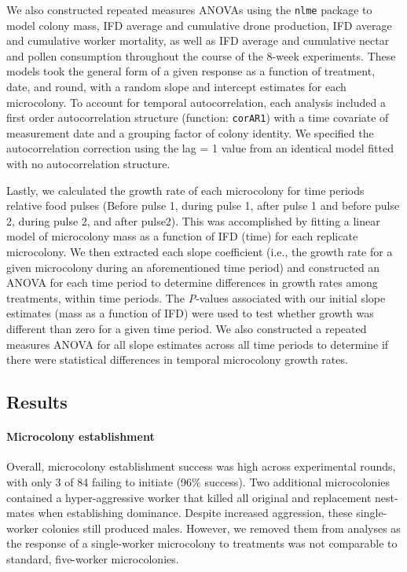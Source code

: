 \documentclass[11pt,]{article}
\let\oldparagraph\paragraph
\renewcommand{\paragraph}[1]{\oldparagraph{#1}\mbox{}}
\begin{document}
We also constructed repeated measures ANOVAs using the \texttt{nlme}
package to model colony mass, IFD average and cumulative drone
production, IFD average and cumulative worker mortality, as well as IFD
average and cumulative nectar and pollen consumption throughout the
course of the 8-week experiments. These models took the general form of
a given response as a function of treatment, date, and round, with a
random slope and intercept estimates for each microcolony. To account
for temporal autocorrelation, each analysis included a first order
autocorrelation structure (function: \texttt{corAR1}) with a time
covariate of measurement date and a grouping factor of colony identity.
We specified the autocorrelation correction using the lag = 1 value from
an identical model fitted with no autocorrelation structure.

Lastly, we calculated the growth rate of each microcolony for time
periods relative food pulses (Before pulse 1, during pulse 1, after
pulse 1 and before pulse 2, during pulse 2, and after pulse2). This was
accomplished by fitting a linear model of microcolony mass as a function
of IFD (time) for each replicate microcolony. We then extracted each
slope coefficient (i.e., the growth rate for a given microcolony during
an aforementioned time period) and constructed an ANOVA for each time
period to determine differences in growth rates among treatments, within
time periods. The \emph{P}-values associated with our initial slope
estimates (mass as a function of IFD) were used to test whether growth
was different than zero for a given time period. We also constructed a
repeated measures ANOVA for all slope estimates across all time periods
to determine if there were statistical differences in temporal
microcolony growth rates.

\hypertarget{results}{%
\subsection{Results}\label{results}}

\hypertarget{microcolony-establishment}{%
\paragraph{Microcolony establishment}\label{microcolony-establishment}}

Overall, microcolony establishment success was high across experimental
rounds, with only 3 of 84 failing to initiate (96\% success). Two
additional microcolonies contained a hyper-aggressive worker that killed
all original and replacement nest-mates when establishing dominance.
Despite increased aggression, these single-worker colonies still
produced males. However, we removed them from analyses as the response
of a single-worker microcolony to treatments was not comparable to
standard, five-worker microcolonies.
\end{document}
